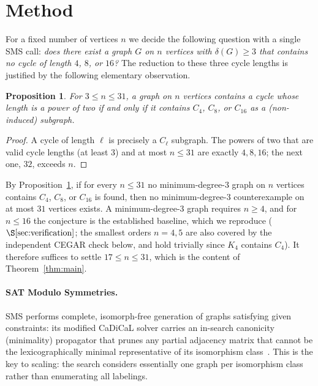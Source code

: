 \documentclass[11pt]{article}
\newtheorem{proposition}{Proposition}
\newcommand{\degmin}{\delta}
\begin{document}
\section{Method}
\label{sec:method}

For a fixed number of vertices $n$ we decide the following question with a single
SMS call: \emph{does there exist a graph $G$ on $n$ vertices with $\degmin(G)\ge 3$
that contains no cycle of length $4$, $8$, or $16$?} The reduction to these three
cycle lengths is justified by the following elementary observation.

\begin{proposition}
\label{prop:reduction}
For $3 \le n \le 31$, a graph on $n$ vertices contains a cycle whose length is a
power of two if and only if it contains $C_4$, $C_8$, or $C_{16}$ as a
(non-induced) subgraph.
\end{proposition}
\begin{proof}
A cycle of length $\ell$ is precisely a $C_\ell$ subgraph. The powers of two that
are valid cycle lengths (at least $3$) and at most $n \le 31$ are exactly $4, 8,
16$; the next one, $32$, exceeds $n$.
\end{proof}

By Proposition~\ref{prop:reduction}, if for every $n \le 31$ no minimum-degree-3
graph on $n$ vertices contains $C_4$, $C_8$, or $C_{16}$ is found, then no
minimum-degree-3 counterexample on at most $31$ vertices exists. A minimum-degree-3
graph requires $n \ge 4$, and for $n \le 16$ the conjecture is the established
baseline, which we reproduce ($\S\ref{sec:verification}$; the smallest orders $n=4,5$
are also covered by the independent CEGAR check below, and hold trivially since
$K_4$ contains $C_4$). It therefore suffices to settle $17 \le n \le 31$, which is the
content of Theorem~\ref{thm:main}.

\paragraph{SAT Modulo Symmetries.} SMS performs complete, isomorph-free
generation of graphs satisfying given constraints: its modified CaDiCaL solver
carries an in-search canonicity (minimality) propagator that prunes any partial
adjacency matrix that cannot be the lexicographically minimal representative of
its isomorphism class~\cite{sms-tocl}. This is the key to scaling: the search
considers essentially one graph per isomorphism class rather than enumerating all
labelings.
\end{document}
